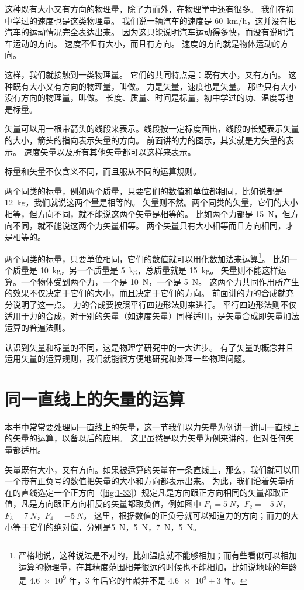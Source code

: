 这种既有大小又有方向的物理量，除了力而外，在物理学中还有很多。
我们在初中学过的速度也是这类物理量。
我们说一辆汽车的速度是 \qty{60}{km/h}，这并没有把汽车的运动情况完全表达出来。
因为这只能说明汽车运动得多快，而没有说明汽车运动的方向。
速度不但有大小，而且有方向。
速度的方向就是物体运动的方向。

这样，我们就接触到一类物理量。
它们的共同特点是：既有大小，又有方向。
这种既有大小又有方向的物理量，叫做。
力是矢量，速度也是矢量。
那些只有大小没有方向的物理量，叫做。
长度、质量、时间是标量，初中学过的功、温度等也是标量。

矢量可以用一根带箭头的线段来表示。线段按一定标度画出，线段的长短表示矢量的大小，箭头的指向表示矢量的方向。
前面讲的力的图示，其实就是力矢量的表示。
速度矢量以及所有其他矢量都可以这样来表示。

标量和矢量不仅含义不同，而且服从不同的运算规则。

两个同类的标量，例如两个质量，只要它们的数值和单位都相同，比如说都是 \qty{12}{kg}，我们就说这两个量是相等的。
矢量则不然。两个同类的矢量，它们的大小相等，但方向不同，就不能说这两个矢量是相等的。
比如两个力都是 \qty{15}{N}，但方向不同，就不能说这两个力矢量相等。
两个矢量只有大小相等而且方向相同，才是相等的。

两个同类的标量，只要单位相同，它们的数值就可以用化数加法来运算\footnote{严格地说，这种说法是不对的，比如温度就不能够相加；而有些看似可以相加运算的物理量，在其精度范围相差很远的时候也不能相加，比如说地球的年龄是 \num{4.6e9} 年，3 年后它的年龄并不是 $\num{4.6e9}+3$ 年。}。
比如一个质量是 \qty{10}{kg}，另一个质量是 \qty{5}{kg}，总质量就是 \qty{15}{kg}。
矢量则不能这样运算。一个物体受到两个力，一个是 \qty{10}{N}，一个是 \qty{5}{N}。
这两个力共同作用所产生的效果不仅决定于它们的大小，而且决定于它们的方向。
前面讲的力的合成就充分说明了这一点。
力的合成要按照平行四边形法则来进行。
平行四边形法则不仅适用于力的合成，对于别的矢量（如速度矢量）同样适用，是矢量合成即矢量加法运算的普遍法则。

认识到矢量和标量的不同，这是物理学研究中的一大进步。
有了矢量的概念并且运用矢量的运算规则，我们就能很方便地研究和处理一些物理问题。

\section{同一直线上的矢量的运算}
本书中常常要处理同一直线上的矢量，这一节我们以力矢量为例讲一讲同一直线上的矢量的运算，以备以后的应用。
这里虽然是以力矢量为例来讲的，但对任何矢量都适用。

矢量既有大小，又有方向。如果被运算的矢量在一条直线上，那么，我们就可以用一个带有正负号的数值把矢量的大小和方向都表示出来。
为此，我们沿着矢量所在的直线选定一个正方向（\cref{fig:1-33}）规定凡是方向跟正方向相同的矢量都取正值，凡是方向跟正方向相反的矢量都取负值，例如图中 $F_1=\qty{5}{N}$，$F_2=-\qty{5}{N}$，$F_3=\qty{7}{N}$，$F_4=-\qty{5}{N}$。
这里，根据数值的正负号就可以知道力的方向；而力的大小等于它们的绝对值，分别是\qty{5}{N}，\qty{5}{N}，\qty{7}{N}，\qty{5}{N}。

